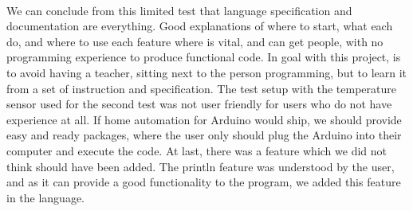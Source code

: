 \\
We can conclude from this limited test that language specification and documentation are everything. Good explanations of where to start, what each do, and where to use each feature where is vital, and can get people, with no programming experience to produce functional code. In goal with this project, is to avoid having a teacher, sitting next to the person programming, but to learn it from a set of instruction and specification. The test setup with the temperature sensor used for the second test was not user friendly for users who do not have experience at all. If home automation for Arduino would ship, we should provide easy and ready packages, where the user only should plug the Arduino into their computer and execute the code. At last, there was a feature which we did not think should have been added. The println feature was understood by the user, and as it can provide a good functionality to the program, we added this feature in the language.
\\